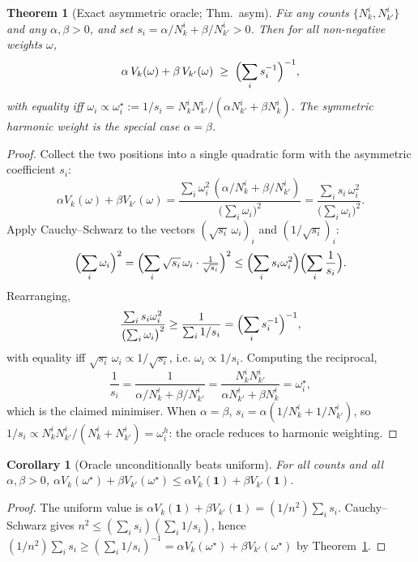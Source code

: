 \documentclass[11pt]{article}
\newtheorem{theorem}{Theorem}
\newtheorem{corollary}{Corollary}
\begin{document}
\begin{theorem}[Exact asymmetric oracle; Thm.~asym]
\label{sup:thm:asym}
Fix any counts $\{N_k^i,N_{k'}^i\}$ and any $\alpha,\beta>0$, and set
$s_i=\alpha/N_k^i+\beta/N_{k'}^i>0$. Then for all non-negative weights
$\omega$,
\[
\alpha\,V_k(\omega)+\beta\,V_{k'}(\omega)
\;\ge\;\Bigl(\sum_i s_i^{-1}\Bigr)^{-1},
\]
with equality iff
$\omega_i\propto\omega_i^\star:=1/s_i
=N_k^iN_{k'}^i/(\alpha N_{k'}^i+\beta N_k^i)$. The symmetric harmonic
weight is the special case $\alpha=\beta$.
\end{theorem}

\begin{proof}
Collect the two positions into a single quadratic form with the
asymmetric coefficient $s_i$:
\[
\alpha V_k(\omega)+\beta V_{k'}(\omega)
=\frac{\sum_i\omega_i^2\,(\alpha/N_k^i+\beta/N_{k'}^i)}
      {\bigl(\sum_i\omega_i\bigr)^2}
=\frac{\sum_i s_i\,\omega_i^2}{\bigl(\sum_i\omega_i\bigr)^2}.
\]
Apply Cauchy--Schwarz to the vectors
$(\sqrt{s_i}\,\omega_i)_i$ and $(1/\sqrt{s_i})_i$:
\[
\Bigl(\sum_i\omega_i\Bigr)^2
=\Bigl(\sum_i\sqrt{s_i}\,\omega_i\cdot\tfrac{1}{\sqrt{s_i}}\Bigr)^2
\le\Bigl(\sum_i s_i\omega_i^2\Bigr)\Bigl(\sum_i\frac{1}{s_i}\Bigr).
\]
Rearranging,
\[
\frac{\sum_i s_i\omega_i^2}{\bigl(\sum_i\omega_i\bigr)^2}
\ge\frac{1}{\sum_i 1/s_i}
=\Bigl(\sum_i s_i^{-1}\Bigr)^{-1},
\]
with equality iff $\sqrt{s_i}\,\omega_i\propto 1/\sqrt{s_i}$, i.e.
$\omega_i\propto 1/s_i$. Computing the reciprocal,
\[
\frac{1}{s_i}=\frac{1}{\alpha/N_k^i+\beta/N_{k'}^i}
=\frac{N_k^iN_{k'}^i}{\alpha N_{k'}^i+\beta N_k^i}
=\omega_i^\star,
\]
which is the claimed minimiser. When $\alpha=\beta$,
$s_i=\alpha(1/N_k^i+1/N_{k'}^i)$, so
$1/s_i\propto N_k^iN_{k'}^i/(N_k^i+N_{k'}^i)=\omega_i^h$: the oracle
reduces to harmonic weighting.
\end{proof}

\begin{corollary}[Oracle unconditionally beats uniform]
\label{sup:cor:beats}
For all counts and all $\alpha,\beta>0$,
$\alpha V_k(\omega^\star)+\beta V_{k'}(\omega^\star)
\le\alpha V_k(\mathbf 1)+\beta V_{k'}(\mathbf 1)$.
\end{corollary}
\begin{proof}
The uniform value is
$\alpha V_k(\mathbf 1)+\beta V_{k'}(\mathbf 1)
=(1/n^2)\sum_i s_i$. Cauchy--Schwarz gives
$n^2\le(\sum_i s_i)(\sum_i 1/s_i)$, hence
$(1/n^2)\sum_i s_i\ge(\sum_i 1/s_i)^{-1}
=\alpha V_k(\omega^\star)+\beta V_{k'}(\omega^\star)$ by
Theorem~\ref{sup:thm:asym}.
\end{proof}
\end{document}
